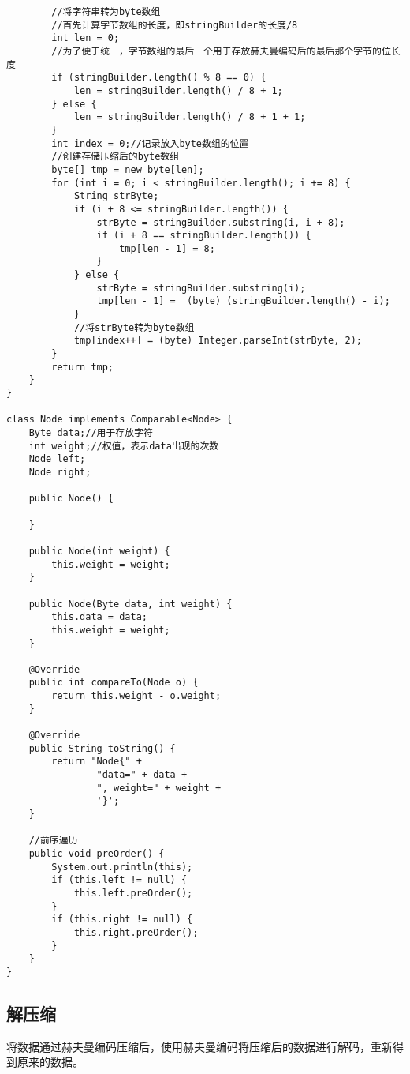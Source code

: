 \documentclass[a4paper]{report}
\begin{document}
\begin{lstlisting}
        //将字符串转为byte数组
        //首先计算字节数组的长度，即stringBuilder的长度/8
        int len = 0;
        //为了便于统一，字节数组的最后一个用于存放赫夫曼编码后的最后那个字节的位长度
        if (stringBuilder.length() % 8 == 0) {
            len = stringBuilder.length() / 8 + 1;
        } else {
            len = stringBuilder.length() / 8 + 1 + 1;
        }
        int index = 0;//记录放入byte数组的位置
        //创建存储压缩后的byte数组
        byte[] tmp = new byte[len];
        for (int i = 0; i < stringBuilder.length(); i += 8) {
            String strByte;
            if (i + 8 <= stringBuilder.length()) {
                strByte = stringBuilder.substring(i, i + 8);
                if (i + 8 == stringBuilder.length()) {
                    tmp[len - 1] = 8;
                }
            } else {
                strByte = stringBuilder.substring(i);
                tmp[len - 1] =  (byte) (stringBuilder.length() - i);
            }
            //将strByte转为byte数组
            tmp[index++] = (byte) Integer.parseInt(strByte, 2);
        }
        return tmp;
    }
}

class Node implements Comparable<Node> {
    Byte data;//用于存放字符
    int weight;//权值，表示data出现的次数
    Node left;
    Node right;

    public Node() {

    }

    public Node(int weight) {
        this.weight = weight;
    }

    public Node(Byte data, int weight) {
        this.data = data;
        this.weight = weight;
    }

    @Override
    public int compareTo(Node o) {
        return this.weight - o.weight;
    }

    @Override
    public String toString() {
        return "Node{" +
                "data=" + data +
                ", weight=" + weight +
                '}';
    }

    //前序遍历
    public void preOrder() {
        System.out.println(this);
        if (this.left != null) {
            this.left.preOrder();
        }
        if (this.right != null) {
            this.right.preOrder();
        }
    }
}
\end{lstlisting}
\subsection{解压缩}
将数据通过赫夫曼编码压缩后，使用赫夫曼编码将压缩后的数据进行解码，重新得到原来的数据。
\end{document}

